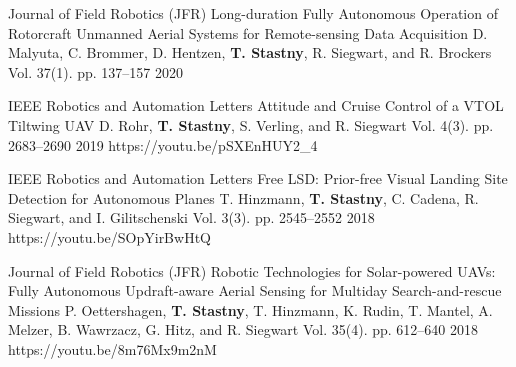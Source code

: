 \begin{cventries}



\begin{flushleft}
\end{flushleft}

\begin{cvnumlist}
%
\item \cvpubentry
	{Journal of Field Robotics (JFR)} %
	{Long-duration Fully Autonomous Operation of Rotorcraft Unmanned Aerial Systems for Remote-sensing Data Acquisition} %
	{D. Malyuta, C. Brommer, D. Hentzen, \textbf{T. Stastny}, R. Siegwart, and R. Brockers} %
	{Vol. 37(1). pp. 137--157} %
	{2020} %
	{} %
	{} %

\item \cvpubentry
	{IEEE Robotics and Automation Letters} %
	{Attitude and Cruise Control of a VTOL Tiltwing UAV} %
	{D. Rohr, \textbf{T. Stastny}, S. Verling, and R. Siegwart} %
	{Vol. 4(3). pp. 2683--2690} %
	{2019} %
	{https://youtu.be/pSXEnHUY2\_4} %
	{} %

\item \cvpubentry
	{IEEE Robotics and Automation Letters} %
	{Free LSD: Prior-free Visual Landing Site Detection for Autonomous Planes} %
	{T. Hinzmann, \textbf{T. Stastny}, C. Cadena, R. Siegwart, and I. Gilitschenski} %
	{Vol. 3(3). pp. 2545--2552} %
	{2018} %
	{https://youtu.be/SOpYirBwHtQ} %
	{} %
	
\item \cvpubentry
	{Journal of Field Robotics (JFR)} %
	{Robotic Technologies for Solar-powered UAVs: Fully Autonomous Updraft-aware Aerial Sensing for Multiday Search-and-rescue Missions} %
	{P. Oettershagen, \textbf{T. Stastny}, T. Hinzmann, K. Rudin, T. Mantel, A. Melzer, B. Wawrzacz, G. Hitz, and R. Siegwart} %
	{Vol. 35(4). pp. 612--640} %
	{2018} %
	{https://youtu.be/8m76Mx9m2nM} %
	{} %


\end{cvnumlist}
\end{cventries}
